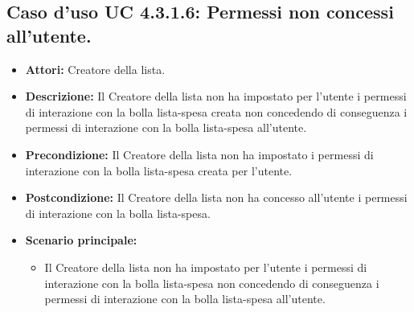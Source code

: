 \subsection{Caso d'uso UC 4.3.1.6: Permessi non concessi all'utente.}
\label{Caso d'uso UC 4.3.1.6: Permessi non concessi all'utente.}

\FloatBarrier
\begin{itemize}
\item \textbf{Attori:} Creatore della lista.
\item \textbf{Descrizione:} Il Creatore della lista non ha impostato per l'utente i permessi di interazione con la bolla lista-spesa creata non concedendo di conseguenza i permessi di interazione con la bolla lista-spesa all'utente.
\item \textbf{Precondizione:} Il Creatore della lista non ha impostato i permessi di interazione con la bolla lista-spesa creata per l'utente.
\item \textbf{Postcondizione:} Il Creatore della lista non ha concesso all'utente i permessi di interazione con la bolla lista-spesa.
\item \textbf{Scenario principale:}
\begin{itemize}
\item Il Creatore della lista non ha impostato per l'utente i permessi di interazione con la bolla lista-spesa non concedendo di conseguenza i permessi di interazione con la bolla lista-spesa all'utente.
\end{itemize}
\end{itemize}